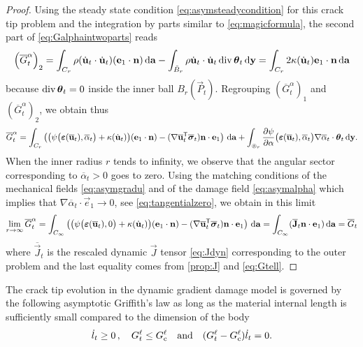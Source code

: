 \begin{proof}
Using the steady state condition \eqref{eq:asymsteadycondition} for this crack tip problem and the integration by parts similar to \eqref{eq:magicformula}, the second part of \eqref{eq:Galphaintwoparts} reads
\[
\left(\overline{G}^\alpha_t\right)_2=\int_{C_r}\rho(\dot{\vec{u}}_t\cdot\dot{\vec{u}}_t)(\vec{e}_1\cdot\vec{n})\D{\vec{a}}-\int_{\tilde{B}_r}\rho\dot{\vec{u}}_t\cdot\dot{\vec{u}}_t\div\vtheta_t\D{\vec{y}}=\int_{C_r}2\kappa(\dot{\vec{u}}_t)\vec{e}_1\cdot\vec{n}\D{\vec{a}}
\]
because $\div\vtheta_t=0$ inside the inner ball $B_r(\vec{P}_t)$. Regrouping $\left(\overline{G}^\alpha_t\right)_1$ and $\left(\overline{G}^\alpha_t\right)_2$, we obtain thus
\[
\overline{G}^\alpha_t=\int_{C_r}\left(\bigl(\psi\bigl(\eps(\overline{\vec{u}}_t),\overline{\alpha}_t\bigr)+\kappa(\dot{\vec{u}}_t)\bigr)(\vec{e}_1\cdot\vec{n})-(\nabla\overline{\vec{u}}_t^\mT\overline{\sig}_t)\vec{n}\cdot\vec{e}_1\right)\D{\vec{a}}+\int_{\circledcirc_r}\frac{\partial\psi}{\partial\alpha}\bigl(\eps(\overline{\vec{u}}_t),\overline{\alpha}_t\bigr)\nabla\overline{\alpha}_t\cdot\vtheta_t\D{\vec{y}}.
\]
When the inner radius $r$ tends to infinity, we observe that the angular sector corresponding to $\overline{\alpha}_t>0$ goes to zero. Using the matching conditions of the mechanical fields \eqref{eq:asymgradu} and of the damage field \eqref{eq:asymalpha} which implies that $\nabla\overline{\alpha}_t\cdot\vec{e}_1\to 0$, see \eqref{eq:tangentialzero}, we obtain in this limit
\[
\lim_{r\to\infty}\overline{G}^\alpha_t=\int_{C_\infty}\left(\bigl(\psi\bigl(\eps(\overline{\vec{u}}_t),0\bigr)+\kappa(\dot{\vec{u}}_t)\bigr)(\vec{e}_1\cdot\vec{n})-(\nabla\overline{\vec{u}}_t^\mT\overline{\sig}_t)\vec{n}\cdot\vec{e}_1\right)\D{\vec{a}}=\int_{C_\infty}(\overline{\vec{J}}_t\vec{n}\cdot\vec{e}_1)\D{\vec{a}}=\overline{G}_t
\]
where $\overline{\vec{J}}_t$ is the rescaled dynamic $\vec{J}$ tensor \eqref{eq:Jdyn} corresponding to the outer problem and the last equality comes from \cref{prop:J} and \eqref{eq:Gtell}.
\end{proof}

\begin{proposition} \label{prop:whenellpetit}
The crack tip evolution in the dynamic gradient damage model is governed by the following asymptotic Griffith's law as long as the material internal length is sufficiently small compared to the dimension of the body
\[
\dot{l}_t\geq 0\,,\quad G_t^\ell\leq G_\mathrm{c}^\ell\quad\text{and}\quad(G_t^\ell-G_\mathrm{c}^\ell)\dot{l}_t=0.
\]
\end{proposition}

